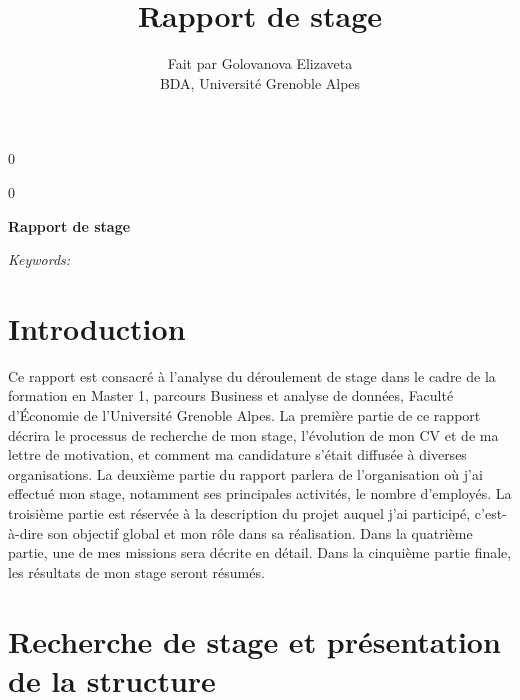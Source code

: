 \documentclass[12pt]{article}
\newcommand{\blind}{0}
\begin{document}
\def\spacingset#1{\renewcommand{\baselinestretch}%
{#1}\small\normalsize} \spacingset{1}



\blind
{
  \title{\bf Rapport de stage}

  \author{
        Fait par Golovanova Elizaveta \\
    BDA, Université Grenoble Alpes\\
      }
  \maketitle
} \fi

\blind
{
  \bigskip
  \bigskip
  \bigskip
  \begin{center}
    {\LARGE\bf Rapport de stage}
  \end{center}
  \medskip
} \fi

\bigskip
\begin{abstract}

\end{abstract}

\noindent%
{\it Keywords:} 
\vfill

\newpage
\spacingset{1.45} %

\newpage
\tableofcontents 
\newpage

\hypertarget{introduction}{%
\section{Introduction}\label{introduction}}

Ce rapport est consacré à l'analyse du déroulement de stage dans le
cadre de la formation en Master 1, parcours Business et analyse de
données, Faculté d'Économie de l'Université Grenoble Alpes. La première
partie de ce rapport décrira le processus de recherche de mon stage,
l'évolution de mon CV et de ma lettre de motivation, et comment ma
candidature s'était diffusée à diverses organisations. La deuxième
partie du rapport parlera de l'organisation où j'ai effectué mon stage,
notamment ses principales activités, le nombre d'employés. La troisième
partie est réservée à la description du projet auquel j'ai participé,
c'est-à-dire son objectif global et mon rôle dans sa réalisation. Dans
la quatrième partie, une de mes missions sera décrite en détail. Dans la
cinquième partie finale, les résultats de mon stage seront résumés.

\section{Recherche de stage et présentation de la structure}
\label{sec:first}
\end{document}
